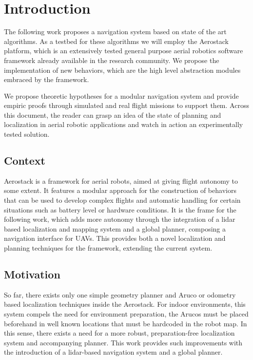 \chapter{Introduction} \label{ch_1:chapter}

  The following work proposes a navigation system based on state of the art algorithms. As a testbed for these algorithms we will employ the Aerostack platform, which is an extensively tested general purpose aerial robotics software framework already available in the research community. We propose the implementation of new behaviors, which are the high level abstraction modules embraced by the framework.

  We propose theoretic hypotheses for a modular navigation system and provide empiric proofs through simulated and real flight missions to support them. Across this document, the reader can grasp an idea of the state of planning and localization in aerial robotic applications and watch in action an experimentally tested solution.

  \section{Context}

    Aerostack is a framework for aerial robots, aimed at giving flight autonomy to some extent. It features a modular approach for the construction of behaviors that can be used to develop complex flights and automatic handling for certain situations such as battery level or hardware conditions. It is the frame for the following work, which adds more autonomy through the integration of a lidar based localization and mapping system and a global planner, composing a navigation interface for UAVs. This provides both a novel localization and planning techniques for the framework, extending the current system.

  \section{Motivation}

    So far, there exists only one simple geometry planner and Aruco or odometry based localization techniques inside the Aerostack. For indoor environments, this system compels the need for environment preparation, the Arucos must be placed beforehand in well known locations that must be hardcoded in the robot map. In this sense, there exists a need for a more robust, preparation-free localization system and accompanying planner. This work provides such improvements with the introduction of a lidar-based navigation system and a global planner.

